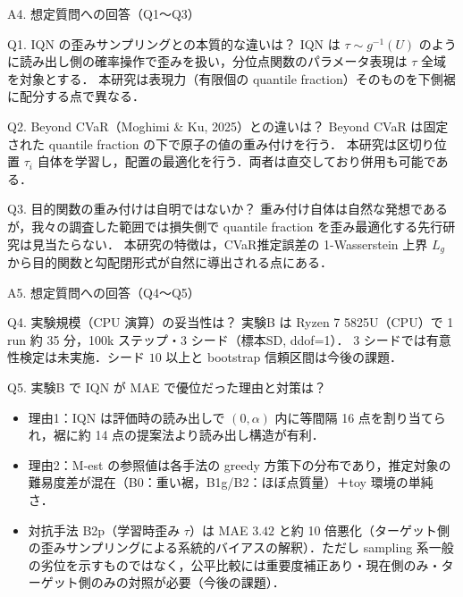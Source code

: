 \documentclass[aspectratio=169, 10pt]{beamer}
\newcommand{\Lg}{L_g}
\begin{document}
\begin{frame}{A4. 想定質問への回答（Q1〜Q3）}
  \begin{alertblock}{Q1. IQN の歪みサンプリングとの本質的な違いは？}
    IQN は $\tau\sim g^{-1}(U)$ のように\alert{読み出し側の確率操作}で歪みを扱い，分位点関数のパラメータ表現は $\tau$ 全域を対象とする．
    本研究は\alert{表現力（有限個の quantile fraction）そのものを下側裾に配分}する点で異なる．
  \end{alertblock}
  \begin{alertblock}{Q2. Beyond CVaR（Moghimi \& Ku, 2025）との違いは？}
    Beyond CVaR は\alert{固定}された quantile fraction の下で原子の\alert{値の重み付け}を行う．
    本研究は\alert{区切り位置 $\tau_i$ 自体を学習}し，配置の最適化を行う．両者は直交しており併用も可能である．
  \end{alertblock}
  \begin{alertblock}{Q3. 目的関数の重み付けは自明ではないか？}
    重み付け自体は自然な発想であるが，我々の調査した範囲では\alert{損失側で quantile fraction を歪み最適化する先行研究は見当たらない}．
    本研究の特徴は，CVaR推定誤差の 1-Wasserstein 上界 $\Lg$ から目的関数と勾配閉形式が\alert{自然に導出される}点にある．
  \end{alertblock}
\end{frame}

\begin{frame}{A5. 想定質問への回答（Q4〜Q5）}
  \begin{alertblock}{Q4. 実験規模（CPU 演算）の妥当性は？}
    実験B は Ryzen 7 5825U（CPU）で 1 run 約 35 分，100k ステップ・3 シード（標本SD, ddof=1）．
    3 シードでは有意性検定は\alert{未実施}．シード $10$ 以上と bootstrap 信頼区間は今後の課題．
  \end{alertblock}
  \begin{alertblock}{Q5. 実験B で IQN が MAE で優位だった理由と対策は？}
    \scriptsize
    \begin{itemize}
      \item 理由1：IQN は評価時の読み出しで $(0,\alpha)$ 内に\alert{等間隔 16 点}を割り当てられ，裾に約 14 点の提案法より読み出し構造が有利．
      \item 理由2：M-est の参照値は各手法の greedy 方策下の分布であり，\alert{推定対象の難易度差}が混在（B0：重い裾，B1g/B2：ほぼ点質量）＋toy 環境の単純さ．
      \item 対抗手法 B2p（学習時歪み $\tau$）は MAE $3.42$ と約 10 倍悪化（\alert{ターゲット側の歪みサンプリングによる系統的バイアス}の解釈）．ただし sampling 系一般の劣位を示すものではなく，公平比較には\alert{重要度補正あり・現在側のみ・ターゲット側のみ}の対照が必要（今後の課題）．
    \end{itemize}
  \end{alertblock}
\end{frame}
\end{document}
